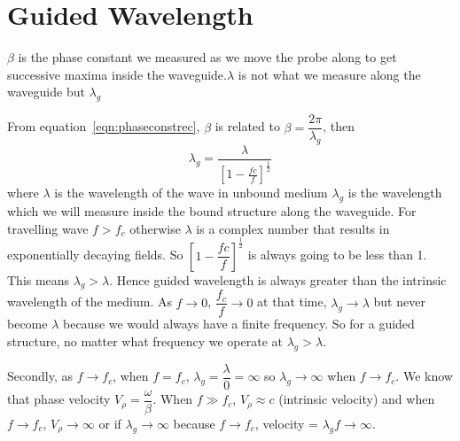 \section{Guided Wavelength}
$\beta$ is the phase constant we measured as we move the probe along to get successive maxima inside the waveguide.$\lambda$ is not what we measure along the waveguide but $\lambda_g$

From equation~\ref{eqn:phaseconstrec}, $\beta$ is related to  $\beta = \dfrac{2\pi}{\lambda_g}$, then 
\begin{dmath}
\lambda_g = \frac{\lambda}{\left[1-{\frac{fc}{f}}\right]^{\frac{1}{2}}}
\label{eqn:lambdag}
\end{dmath}
where $\lambda$ is the wavelength of the wave in unbound medium $\lambda_g$ is the wavelength which we will measure inside the bound structure along the waveguide. For travelling wave $f>f_c$ otherwise $\lambda$ is a complex number that results in exponentially decaying fields. So $\left[1-{\dfrac{fc}{f}}\right]^{\frac{1}{2}}$ is always going to be less than 1. This means $\lambda_g>\lambda$. Hence guided wavelength is always greater than the intrinsic wavelength of the medium. As $f\longrightarrow0$, $\dfrac{f_c}{f}\longrightarrow0$ at that time, $\lambda_g\longrightarrow\lambda$ but never become $\lambda$ because we would always have a finite frequency. So for a guided structure, no matter what frequency we operate at $\lambda_g>\lambda$.

Secondly, as $f\longrightarrow f_c$, when $f=f_c$, $\lambda_g = \dfrac{\lambda}{0} = \infty$ so $\lambda_g\longrightarrow\infty$ when $f\longrightarrow f_c$. We know that phase velocity $V_\rho = \dfrac{\omega}{\beta}$. When $f\gg f_c$, $V_\rho\approx c$ (intrinsic velocity) and when $f\longrightarrow f_c$, $V_\rho\longrightarrow\infty$ or if $\lambda_g\longrightarrow\infty$ because $f\longrightarrow f_c$, velocity = $\lambda_gf\longrightarrow\infty$.


